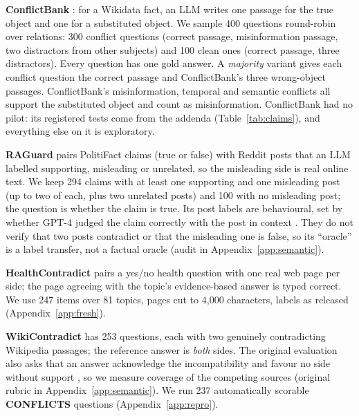 \textbf{ConflictBank} \citep{su2024conflictbank}: for a Wikidata fact, an LLM writes one passage for the true
object and one for a substituted object. We sample 400 questions round-robin over relations: 300 conflict questions
(correct passage, misinformation passage, two distractors from other subjects) and 100 clean ones (correct passage,
three distractors). Every question has one gold answer. A
\emph{majority} variant gives each conflict question the correct passage and ConflictBank's three wrong-object
passages. ConflictBank's misinformation, temporal
and semantic conflicts all support the substituted object and count as misinformation. ConflictBank had no pilot: its registered tests come from the addenda (Table~\ref{tab:claims}), and everything else on it is exploratory.

\textbf{RAGuard} \citep{zeng2025raguard} pairs PolitiFact claims (true or false) with Reddit posts that an LLM
labelled supporting, misleading or unrelated, so the misleading side is real online text. We keep 294 claims with at
least one supporting and one misleading post (up to two of each, plus two unrelated posts) and 100 with no
misleading post; the question is whether the claim is true. Its post labels are behavioural, set by whether GPT-4 judged the claim correctly with the post in context \citep[\S3.3]{zeng2025raguard}. They do not verify that two posts contradict or that the misleading one is false, so its ``oracle'' is a label transfer, not a factual oracle (audit in Appendix~\ref{app:semantic}).

\textbf{HealthContradict} \citep{zhang2026healthcontradict} pairs a yes/no health question with one real web page per side; the page agreeing with the topic's evidence-based answer is typed correct. We use 247 items over 81 topics, pages cut to 4,000 characters, labels as released (Appendix~\ref{app:fresh}).

\textbf{WikiContradict} \citep{hou2024wikicontradict} has 253 questions, each with two genuinely contradicting
Wikipedia passages; the reference answer is \emph{both} sides. The original evaluation also asks that an answer acknowledge the incompatibility and favour no side without support \citep[\S3.4]{hou2024wikicontradict}, so we measure coverage of the competing sources (original rubric in Appendix~\ref{app:semantic}). We run 237 automatically scorable
\textbf{CONFLICTS} \citep{cattan2025conflicts} questions (Appendix~\ref{app:repro}).

